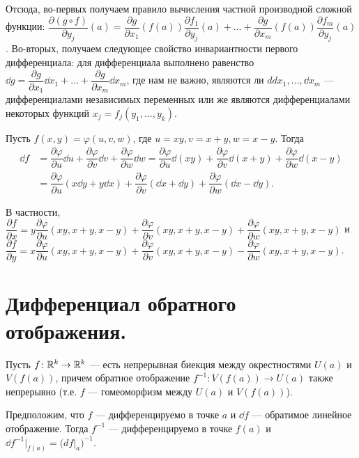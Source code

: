 \documentclass[a4paper]{article}
\theoremstyle{named}
\begin{document}
\begin{remark*}
        Отсюда, во-первых получаем правило вычисления частной производной сложной функции:
        $\dfrac{\partial (g\circ f)}{\partial y_j}(a) =
        \dfrac{\partial g}{\partial x_1}(f(a)) \dfrac{\partial f_1}{\partial y_j}(a)+\ldots+
        \dfrac{\partial g}{\partial x_m}(f(a)) \dfrac{\partial f_m}{\partial y_j}(a)$.
        Во-вторых, получаем следующее свойство инвариантности первого дифференциала:
        для дифференциала выполнено равенство
        $\dd g = \dfrac{\partial g}{\partial x_1}\dd x_1+\ldots+\dfrac{\partial g}{\partial x_m}\dd x_m$,
        где нам не важно, являются ли $
        dd x_1,\ldots, \dd x_m$ --- дифференциалами независимых переменных
        или же являются дифференциалами некоторых функций $x_j = f_j(y_1,\ldots, y_k)$.
    \end{remark*}

    \begin{example*}
        Пусть $f(x,y) = \varphi(u, v, w)$, где $u=xy, v= x+y, w=x-y$.
        Тогда
        \begin{align*}
            \dd f 
            &= \dfrac{\partial \varphi}{\partial u} \dd u + \dfrac{\partial \varphi}{\partial v} \dd v + \dfrac{\partial \varphi}{\partial w} \dd w 
            = \dfrac{\partial \varphi}{\partial u} \dd(xy) + \dfrac{\partial \varphi}{\partial v} \dd(x+y) + \dfrac{\partial \varphi}{\partial w} \dd(x-y) \\
            &= \dfrac{\partial \varphi}{\partial u} (x\dd y + y\dd x) +
            \dfrac{\partial \varphi}{\partial v} (\dd x+\dd y) + \dfrac{\partial \varphi}{\partial w} (\dd x - \dd y).
        \end{align*}

        В частности,
        $\dfrac{\partial f}{\partial x} = y\dfrac{\partial \varphi}{\partial u}(xy, x+y, x-y) +
        \dfrac{\partial \varphi}{\partial v}(xy, x+y, x-y) +  \dfrac{\partial \varphi}{\partial w}(xy, x+y, x-y)$
        и $\dfrac{\partial f}{\partial y} = x\dfrac{\partial \varphi}{\partial u}(xy, x+y, x-y) +
        \dfrac{\partial \varphi}{\partial v}(xy, x+y, x-y) -  \dfrac{\partial \varphi}{\partial w}(xy, x+y, x-y)$.
    \end{example*}

    \section{Дифференциал обратного отображения.}

    \begin{theorem*}
        Пусть $f\colon \mathbb{R}^k\to \mathbb{R}^k$ --- есть непрерывная биекция между окрестностями $U(a)$ и $V(f(a))$,
        причем обратное отображение $f^{-1}\colon V(f(a))\to U(a)$ также непрерывно (т.е. $f$ --- гомеоморфизм между $U(a)$ и $V(f(a))$).

        Предположим, что $f$ --- дифференцируемо в точке $a$ и $\dd f$ --- обратимое линейное отображение.
        Тогда $f^{-1}$ --- дифференцируемо в точке $f(a)$ и $\dd f^{-1}\bigl|_{f(a)} = \bigr(df\bigl|_a\bigl)^{-1}$.
    \end{theorem*}
\end{document}
